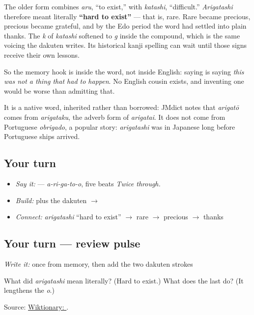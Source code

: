 \begin{cousinweb}
The older form combines \emph{aru}, \textquotedblleft{}to exist,\textquotedblright{} with \emph{katashi}, \textquotedblleft{}difficult.\textquotedblright{} \emph{Arigatashi} therefore meant literally \textbf{\textquotedblleft{}hard to exist\textquotedblright{}} — that is, rare. Rare became precious, precious became grateful, and by the Edo period the word had settled into plain thanks. The \emph{k} of \emph{katashi} softened to \emph{g} inside the compound, which is the same voicing the dakuten writes. Its historical kanji spelling can wait until those signs receive their own lessons.

So the memory hook is inside the word, not inside English: saying \textbf{} is saying \emph{this was not a thing that had to happen}. No English cousin exists, and inventing one would be worse than admitting that.

It is a native word, inherited rather than borrowed: JMdict notes that \emph{arigatō} comes from \emph{arigataku}, the adverb form of \emph{arigatai}. It does not come from Portuguese \emph{obrigado}, a popular story: \emph{arigatashi} was in Japanese long before Portuguese ships arrived.
\end{cousinweb}

\subsection*{Your turn}
\begin{itemize}
\raggedright
  \item \emph{Say it:} \textbf{} — \emph{a-ri-ga-to-o}, five beats \emph{Twice through.}
  \item \emph{Build:} \textbf{} plus the dakuten $\to$ \textbf{}
  \item \emph{Connect:} \emph{arigatashi} \textquotedblleft{}hard to exist\textquotedblright{} $\to$ rare $\to$ precious $\to$ thanks
\end{itemize}

\subsection*{Your turn — review pulse}
\emph{Write it:} \textbf{} once from memory, then add the two dakuten strokes

\begin{tcolorbox}[breakable,colback=teal!4,colframe=teal!35!black,title={Before you move on}]
What did \emph{arigatashi} mean literally? (Hard to exist.) What does the last \textbf{} do? (It lengthens the \emph{o}.)

Source: \href{https://en.wiktionary.org/wiki/\%E6\%9C\%89\%E9\%9B\%A3\%E3\%81\%86}{Wiktionary: }.
\end{tcolorbox}
